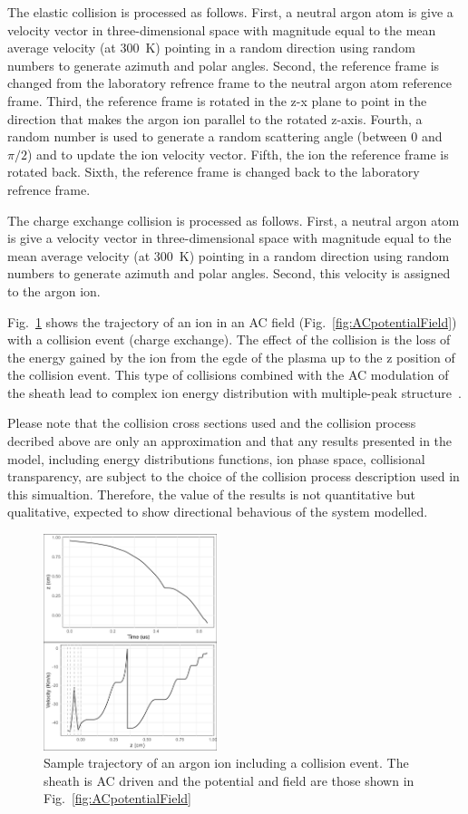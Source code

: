 The elastic collision is processed as follows. First, a neutral argon atom is give a velocity vector in three-dimensional space  with magnitude equal to the mean average velocity (at 300~K) pointing in a random direction using random numbers to generate azimuth and polar angles. Second, the reference frame is changed from the laboratory refrence frame to the neutral argon atom reference frame. Third, the reference frame is rotated in the z-x plane to point in the direction that makes the argon ion parallel to the rotated z-axis. Fourth, a random number is used to generate a random scattering angle (between 0 and $\pi/2$) and to update the ion velocity vector. Fifth, the ion the reference frame is rotated back. Sixth, the reference frame is changed back to the laboratory refrence frame.

The charge exchange collision is processed as follows. First, a neutral argon atom is give a velocity vector in three-dimensional space  with magnitude equal to the mean average velocity (at 300~K) pointing in a random direction using random numbers to generate azimuth and polar angles. Second, this velocity is assigned to the argon ion.    

Fig.~\ref{fig:CollisionACtrajectory} shows the trajectory of an ion in an AC field (Fig.~\ref{fig:ACpotentialField}) with a collision event (charge exchange). The effect of the collision is the loss of the energy gained by the ion from the egde of the plasma up to the z position of the collision event. This type of collisions combined with the AC modulation of the sheath lead to complex ion energy distribution with multiple-peak structure~\cite{Wild1991}.

Please note that the collision cross sections used and the collision process decribed above are only an approximation and that any results presented in the model, including energy distributions functions, ion phase space, collisional transparency, are subject to the choice of the collision process description used in this simualtion. Therefore, the value of the results is not quantitative but qualitative, expected to show directional behavious of the system modelled.  

\begin{figure}[htbp]
\centering
\includegraphics[width=0.45\textwidth]{Figures/ionTrajectory0.5Pa13.56MHz2kVStack2332.jpeg}
\caption{Sample trajectory of an argon ion including a collision event. The sheath is AC driven and the potential and field are those shown in Fig.~\ref{fig:ACpotentialField} }
\label{fig:CollisionACtrajectory}
\end{figure}
